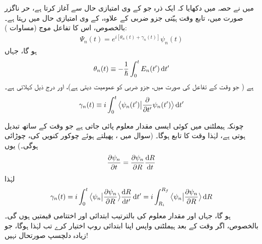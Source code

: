 میں نے حصہ    میں دکھایا کہ  ایک ذرہ جو  کے  وی امتیازی حال سے آغاز کرتا ہے،  حر ناگزر صورت  میں، تابع وقت ہیّتی جزو ضربی کے علاوہ،   کے   وی امتیازی حال میں  رہتا ہے۔ بالخصوص،  اس کا تفاعل موج (مساوات  ):
\begin{align}
\Psi_n (t) = e^{i[\theta_n (t) + \gamma_n (t)]} \psi_n (t)
\end{align} 
ہو گا، جہاں 
\begin{align}
\theta_n (t) \equiv - \frac{1}{\hslash} \int_0^t E_n (t') \dif t'
\end{align}
  ہے ( جو وقت کے  تفاعل  کی صورت میں،   جزو ضربی  کو عمومیت دیتی ہے)،   اور درج ذیل  کہلاتی ہے۔
\begin{align}
\gamma_n(t)\equiv i\int_0^t \big\langle \psi_n(t')\big|\frac{\partial}{\partial t'}\psi_n(t')\big \rangle \dif t'
\end{align}

 چونکہ  ہیملٹنی میں کوئی ایسی مقدار معلوم  پائی  جاتی  ہے جو وقت کے ساتھ تبدیل ہوتی  ہے، لہٰذا  وقت  کا تابع ہوگا۔   (سوال    میں  ،  پھیلتے ہوئے چوکور کنویں کی،  چوڑائی  ہوگی۔)  یوں
\begin{align}\label{مساوات_حر_ایک_مقدار_معلوم}
\frac{\partial \psi_n}{\partial t} = \frac{\partial \psi_n}{\partial R} \frac{\dif R}{\dif t}
\end{align}
لہٰذا 
\begin{align}
\gamma_n (t) = i \int_0^t \big\langle \psi_n \big| \frac{\partial \psi_n}{\partial R} \big\rangle \frac{\dif R}{\dif t'} \dif t' = i \int_{R_i}^{R_f} \big\langle \psi_n \big | \frac{\partial \psi_n}{\partial R}\big \rangle \dif R 
\end{align}
ہو گا، جہاں  اور  مقدار معلوم  کی بالترتیب ابتدائی اور اختتامی قیمتیں ہوں گی۔ بالخصوص،  اگر وقت   کے  بعد ہیملٹنی واپس اپنا  ابتدائی روپ اختیار کرے تب  لہٰذا  ہوگا،  جو زیادہ دلچسپ  صورتحال نہیں!

